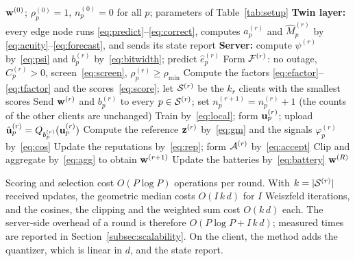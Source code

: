 \begin{algorithm}[t]
	\caption{ATEF-DT.}
	\label{alg:atef}
	\footnotesize
	\begin{algorithmic}[1]
		\REQUIRE $\mathbf{w}^{(0)}$; $\rho_p^{(0)}=1$, $n_p^{(0)}=0$ for all $p$; parameters of Table~\ref{tab:setup}
		\STATE \textbf{Twin layer:} every edge node runs \eqref{eq:predict}--\eqref{eq:correct}, computes $a_p^{(r)}$ and $\widehat{M}_p^{(r)}$ by \eqref{eq:acuity}--\eqref{eq:forecast}, and sends its state report
		\STATE \textbf{Server:} compute $\psi^{(r)}$ by~\eqref{eq:psi} and $b_p^{(r)}$ by~\eqref{eq:bitwidth}; predict $\hat e_p^{(r)}$
		\STATE Form $\mathcal{F}^{(r)}$: no outage, $C_p^{(r)}>0$, screen~\eqref{eq:screen}, $\rho_p^{(r)}\ge\rho_{\min}$
		\STATE Compute the factors \eqref{eq:efactor}--\eqref{eq:tfactor} and the scores~\eqref{eq:score}; let $\mathcal{S}^{(r)}$ be the $k_r$ clients with the smallest scores
		\STATE Send $\mathbf{w}^{(r)}$ and $b_p^{(r)}$ to every $p\in\mathcal{S}^{(r)}$; set $n_p^{(r+1)}=n_p^{(r)}+1$ (the counts of the other clients are unchanged)
		\STATE Train by~\eqref{eq:local}; form $\mathbf{u}_p^{(r)}$; upload $\hat{\mathbf{u}}_p^{(r)}=Q_{b_p^{(r)}}(\mathbf{u}_p^{(r)})$
		\ENDFOR
		\STATE Compute the reference $\mathbf{z}^{(r)}$ by~\eqref{eq:gm} and the signals $\varphi_p^{(r)}$ by~\eqref{eq:cos}
		\STATE Update the reputations by~\eqref{eq:rep}; form $\mathcal{A}^{(r)}$ by~\eqref{eq:accept}
		\STATE Clip and aggregate by~\eqref{eq:agg} to obtain $\mathbf{w}^{(r+1)}$
		\STATE Update the batteries by~\eqref{eq:battery}
		\ENDFOR
		\RETURN $\mathbf{w}^{(R)}$
	\end{algorithmic}
\end{algorithm}

Scoring and selection cost $O(P\log P)$ operations per round. With $k=|\mathcal{S}^{(r)}|$ received updates, the geometric median costs $O(I\,k\,d)$ for $I$ Weiszfeld iterations, and the cosines, the clipping and the weighted sum cost $O(k\,d)$ each. The server-side overhead of a round is therefore $O(P\log P+I\,k\,d)$; measured times are reported in Section~\ref{subsec:scalability}. On the client, the method adds the quantizer, which is linear in $d$, and the state report.
